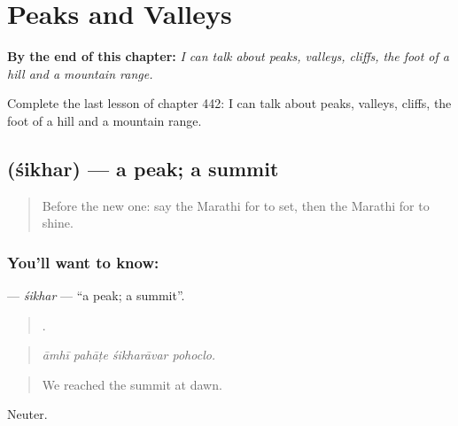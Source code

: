 
\chapter{Peaks and Valleys}
\label{ch:mr-peaks-and-valleys}

\begin{chapteropening}
\textbf{By the end of this chapter:} \emph{I can talk about peaks, valleys, cliffs, the foot of a hill and a mountain range.}

Complete the last lesson of chapter 442: I can talk about peaks, valleys, cliffs, the foot of a hill and a mountain range.
\end{chapteropening}

\section[\texorpdfstring{\mr{शिखर} (śikhar)}{शिखर (śikhar)}]{ (śikhar) — a peak; a summit}

\label{lesson:MR-C442-sikhar}



\begin{quote}
Before the new one: say the Marathi for to set, then the Marathi for to shine.
\end{quote}

\subsection*{You'll want to know: }
\textbf{} — \emph{śikhar} — \textquotedblleft{}a peak; a summit\textquotedblright{}.

\begin{quote}
   .
\end{quote}

\begin{quote}
\emph{āmhī pahāṭe śikharāvar pohoclo.}
\end{quote}

\begin{quote}
We reached the summit at dawn.
\end{quote}

Neuter.

